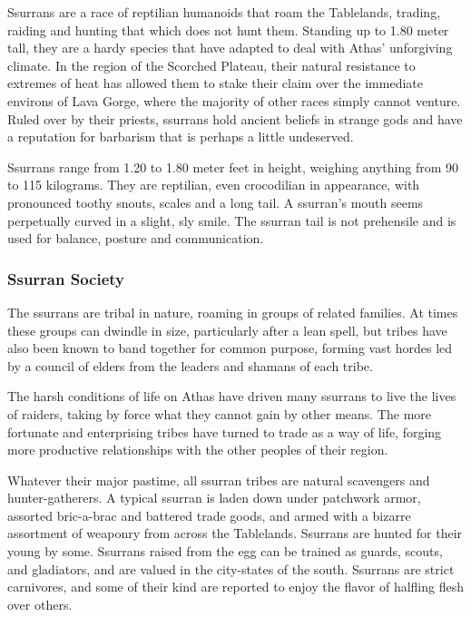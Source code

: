 
Ssurrans are a race of reptilian humanoids that roam the Tablelands, trading, raiding and hunting that which does not hunt them. Standing up to 1.80 meter tall, they are a hardy species that have adapted to deal with Athas' unforgiving climate. In the region of the Scorched Plateau, their natural resistance to extremes of heat has allowed them to stake their claim over the immediate environs of Lava Gorge, where the majority of other races simply cannot venture. Ruled over by their priests, ssurrans hold ancient beliefs in strange gods and have a reputation for barbarism that is perhaps a little undeserved.

Ssurrans range from 1.20 to 1.80 meter feet in height, weighing anything from 90 to 115 kilograms. They are reptilian, even crocodilian in appearance, with pronounced toothy snouts, scales and a long tail. A ssurran's mouth seems perpetually curved in a slight, sly smile. The ssurran tail is not prehensile and is used for balance, posture and communication.

\subsubsection{Ssurran Society}
The ssurrans are tribal in nature, roaming in groups of related families. At times these groups can dwindle in size, particularly after a lean spell, but tribes have also been known to band together for common purpose, forming vast hordes led by a council of elders from the leaders and shamans of each tribe.

The harsh conditions of life on Athas have driven many ssurrans to live the lives of raiders, taking by force what they cannot gain by other means. The more fortunate and enterprising tribes have turned to trade as a way of life, forging more productive relationships with the other peoples of their region.

Whatever their major pastime, all ssurran tribes are natural scavengers and hunter-gatherers. A typical ssurran is laden down under patchwork armor, assorted bric-a-brac and battered trade goods, and armed with a bizarre assortment of weaponry from across the Tablelands. Ssurrans are hunted for their young by some. Ssurrans raised from the egg can be trained as guards, scouts, and gladiators, and are valued in the city-states of the south. Ssurrans are strict carnivores, and some of their kind are reported to enjoy the flavor of halfling flesh over others.


